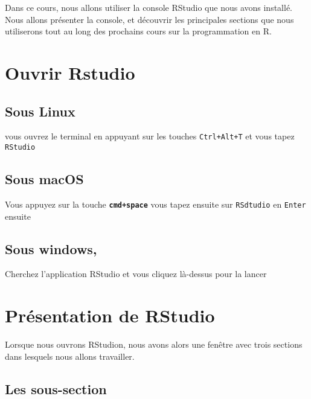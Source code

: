 \documentclass[11pt]{article}
\begin{document}
    Dans ce cours, nous allons utiliser la console RStudio que nous avons
installé. Nous allons présenter la console, et découvrir les principales
sections que nous utiliserons tout au long des prochains cours sur la
programmation en R.

    \hypertarget{ouvrir-rstudio}{%
\section{Ouvrir Rstudio}\label{ouvrir-rstudio}}

    \hypertarget{sous-linux}{%
\subsection{Sous Linux}\label{sous-linux}}

vous ouvrez le terminal en appuyant sur les touches \texttt{Ctrl+Alt+T}
et vous tapez \texttt{RStudio}

    \hypertarget{sous-macos}{%
\subsection{Sous macOS}\label{sous-macos}}

Vous appuyez sur la touche \textbf{\texttt{cmd+space}} vous tapez
ensuite sur \texttt{RSdtudio} en \texttt{Enter} ensuite

    \hypertarget{sous-windows}{%
\subsection{Sous windows,}\label{sous-windows}}

Cherchez l'application RStudio et vous cliquez là-dessus pour la lancer

    \hypertarget{pruxe9sentation-de-rstudio}{%
\section{Présentation de RStudio}\label{pruxe9sentation-de-rstudio}}

    Lorsque nous ouvrons RStudion, nous avons alors une fenêtre avec trois
sections dans lesquels nous allons travailler.

    

    \hypertarget{les-sous-section}{%
\subsection{Les sous-section}\label{les-sous-section}}
\end{document}
